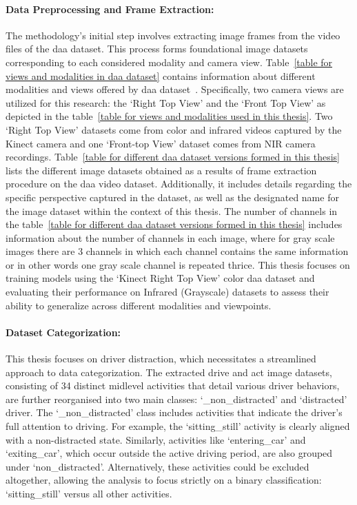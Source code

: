 \paragraph{Data Preprocessing and Frame Extraction:} The methodology's initial step involves extracting image frames from the video files of the \gls{daa} dataset. This process forms foundational image datasets corresponding to each considered modality and camera view. Table~\ref{table for views and modalities in daa dataset} contains information about different modalities and views offered by \gls{daa} dataset~\citet{martin2019drive_and_act_2019_iccv}. Specifically, two camera views are utilized for this research: the `Right Top View' and the `Front Top View' as depicted in the table~\ref{table for views and modalities used in this thesis}. Two `Right Top View' datasets come from color and infrared videos captured by the Kinect camera and one `Front-top View' dataset comes from NIR camera recordings. Table~\ref{table for different daa dataset versions formed in this thesis} lists the different image datasets obtained as a results of frame extraction procedure on the \gls{daa} video dataset. Additionally, it includes details regarding the specific perspective captured in the dataset, as well as the designated name for the image dataset within the context of this thesis. The number of channels in the table~\ref{table for different daa dataset versions formed in this thesis} includes information about the number of channels in each image, where for gray scale images there are 3 channels in which each channel contains the same information or in other words one gray scale channel is repeated thrice. This thesis focuses on training models using the `Kinect Right Top View' color \gls{daa} dataset and evaluating their performance on Infrared (Grayscale) datasets to assess their ability to generalize across different modalities and viewpoints.

\paragraph{Dataset Categorization:} This thesis focuses on driver distraction, which necessitates a streamlined approach to data categorization. The extracted drive and act image datasets, consisting of 34 distinct midlevel activities that detail various driver behaviors, are further reorganised into two main classes: `\_non\_distracted' and `distracted' driver. The `\_non\_distracted' class includes activities that indicate the driver's full attention to driving. For example, the `sitting\_still' activity is clearly aligned with a non-distracted state. Similarly, activities like `entering\_car' and `exiting\_car', which occur outside the active driving period, are also grouped under `non\_distracted'. Alternatively, these activities could be excluded altogether, allowing the analysis to focus strictly on a binary classification: `sitting\_still' versus all other activities. 

